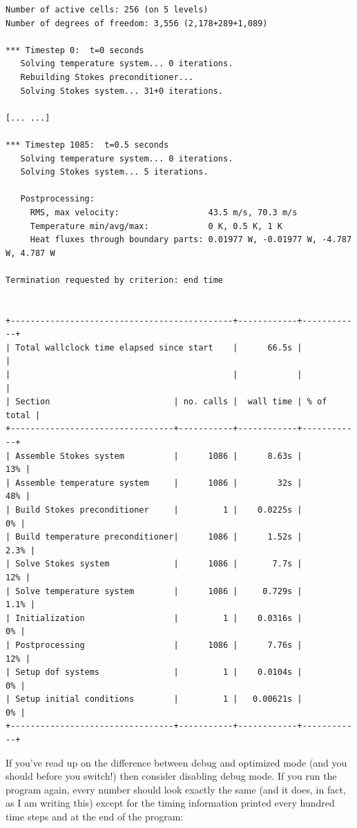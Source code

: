 \documentclass{article}
\begin{document}
\begin{lstlisting}[frame=single,language=ksh]
Number of active cells: 256 (on 5 levels)
Number of degrees of freedom: 3,556 (2,178+289+1,089)

*** Timestep 0:  t=0 seconds
   Solving temperature system... 0 iterations.
   Rebuilding Stokes preconditioner...
   Solving Stokes system... 31+0 iterations.

[... ...]

*** Timestep 1085:  t=0.5 seconds
   Solving temperature system... 0 iterations.
   Solving Stokes system... 5 iterations.

   Postprocessing:
     RMS, max velocity:                  43.5 m/s, 70.3 m/s
     Temperature min/avg/max:            0 K, 0.5 K, 1 K
     Heat fluxes through boundary parts: 0.01977 W, -0.01977 W, -4.787 W, 4.787 W

Termination requested by criterion: end time


+---------------------------------------------+------------+------------+
| Total wallclock time elapsed since start    |      66.5s |            |
|                                             |            |            |
| Section                         | no. calls |  wall time | % of total |
+---------------------------------+-----------+------------+------------+
| Assemble Stokes system          |      1086 |      8.63s |        13% |
| Assemble temperature system     |      1086 |        32s |        48% |
| Build Stokes preconditioner     |         1 |    0.0225s |         0% |
| Build temperature preconditioner|      1086 |      1.52s |       2.3% |
| Solve Stokes system             |      1086 |       7.7s |        12% |
| Solve temperature system        |      1086 |     0.729s |       1.1% |
| Initialization                  |         1 |    0.0316s |         0% |
| Postprocessing                  |      1086 |      7.76s |        12% |
| Setup dof systems               |         1 |    0.0104s |         0% |
| Setup initial conditions        |         1 |   0.00621s |         0% |
+---------------------------------+-----------+------------+------------+
\end{lstlisting}

If you've read up on the difference between debug and optimized mode (and you
should before you switch!) then consider disabling debug mode. If you run the
program again, every number should look exactly the same (and it does, in fact,
as I am writing this) except for the timing information printed every hundred
time steps and at the end of the program:
\end{document}
